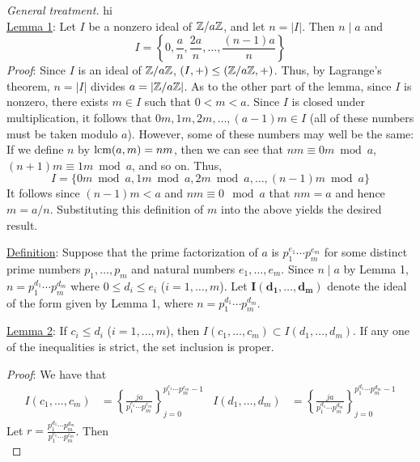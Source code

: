 \documentclass[../psets.tex]{subfiles}
\begin{document}
\begin{enumerate}
\begin{proof}[General treatment]
        
        {\color{white}hi}\\
        \underline{Lemma 1}: Let $I$ be a nonzero ideal of $\mathbb{Z}/a\mathbb{Z}$, and let $n=|I|$. Then $n\mid a$ and
        \begin{equation*}
            I = \left\{ 0,\frac{a}{n},\frac{2a}{n},\dots,\frac{(n-1)a}{n} \right\}
        \end{equation*}
        \emph{Proof}: Since $I$ is an ideal of $\mathbb{Z}/a\mathbb{Z}$, $(I,+)\leq(\mathbb{Z}/a\mathbb{Z},+)$. Thus, by Lagrange's theorem, $n=|I|$ divides $a=|\mathbb{Z}/a\mathbb{Z}|$. As to the other part of the lemma, since $I$ is nonzero, there exists $m\in I$ such that $0<m<a$. Since $I$ is closed under multiplication, it follows that $0m,1m,2m,\dots,(a-1)m\in I$ (all of these numbers must be taken modulo $a$). However, some of these numbers may well be the same: If we define $n$ by $\operatorname{lcm}(a,m)=nm$, then we can see that $nm\equiv 0m\bmod a$, $(n+1)m\equiv 1m\bmod a$, and so on. Thus,
        \begin{equation*}
            I = \{0m\bmod a,1m\bmod a,2m\bmod a,\dots,(n-1)m\bmod a\}
        \end{equation*}
        It follows since $(n-1)m<a$ and $nm\equiv 0\mod a$ that $nm=a$ and hence $m=a/n$. Substituting this definition of $m$ into the above yields the desired result.\par\smallskip
        \underline{Definition}: Suppose that the prime factorization of $a$ is $p_1^{e_1}\cdots p_m^{e_m}$ for some distinct prime numbers $p_1,\dots,p_m$ and natural numbers $e_1,\dots,e_m$. Since $n\mid a$ by Lemma 1, $n=p_1^{d_1}\cdots p_m^{d_m}$ where $0\leq d_i\leq e_i$ ($i=1,\dots,m$). Let $\bm{I(d_1,\ldots,d_m)}$ denote the ideal of the form given by Lemma 1, where $n=p_1^{d_1}\cdots p_m^{d_m}$.\par\smallskip
        \underline{Lemma 2}: If $c_i\leq d_i$ ($i=1,\dots,m$), then $I(c_1,\dots,c_m)\subset I(d_1,\dots,d_m)$. If any one of the inequalities is strict, the set inclusion is proper.\par
        \emph{Proof}: We have that
        \begin{align*}
            I(c_1,\dots,c_m) &= \left\{ \frac{ja}{p_1^{c_1}\cdots p_m^{c_m}} \right\}_{j=0}^{p_1^{c_1}\cdots p_m^{c_m}-1}&
            I(d_1,\dots,d_m) &= \left\{ \frac{ja}{p_1^{d_1}\cdots p_m^{d_m}} \right\}_{j=0}^{p_1^{d_1}\cdots p_m^{d_m}-1}
        \end{align*}
        Let $r=\frac{p_1^{d_1}\cdots p_m^{d_m}}{p_1^{c_1}\cdots p_m^{c_m}}$. Then
        \begin{equation*}

\end{equation*}
\end{proof}
\end{enumerate}
\end{document}
